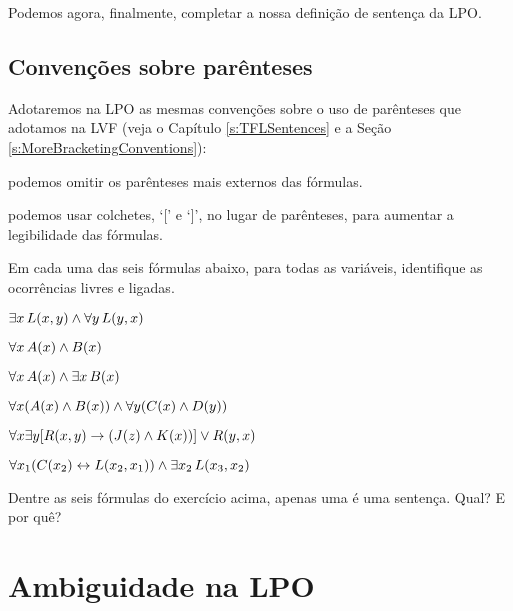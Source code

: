 Podemos agora, finalmente, completar a nossa definição de sentença da LPO.


\section{Convenções sobre parênteses}

Adotaremos na LPO as mesmas convenções sobre o uso de parênteses que adotamos na LVF (veja o Capítulo \ref{s:TFLSentences} e a Seção \ref{s:MoreBracketingConventions}):
\begin{ebullet}
	\item podemos omitir os parênteses mais externos das fórmulas.
	\item podemos usar colchetes, `[' e `]', no lugar de parênteses, para aumentar a legibilidade das fórmulas.
\end{ebullet}



\practiceproblems
\problempart
\label{pr.freeFOL}
Em cada uma das seis fórmulas abaixo, para todas as variáveis, identifique as ocorrências livres e ligadas.
\begin{earg}
\item $\exists x\, \mathord{L}(x,y) \wedge \forall y\, \mathord{L}(y,x)$
\item $\forall x\, \mathord{A}(x) \wedge \mathord{B}(x)$
\item $\forall x\, \mathord{A}(x) \wedge \exists x\, \mathord{B}(x)$
\item $\forall x (\mathord{A}(x) \wedge \mathord{B}(x)) \wedge \forall y(\mathord{C}(x) \wedge \mathord{D}(y))$
\item $\forall x\exists y[\mathord{R}(x,y) \rightarrow (\mathord{J}(z) \wedge \mathord{K}(x))] \vee \mathord{R}(y,x)$
\item $\forall x_1(\mathord{C}(x_2) \leftrightarrow \mathord{L}(x_2,x_1)) \wedge \exists x_2\,\mathord{L}(x_3,x_2)$
\end{earg}

\problempart
Dentre as seis fórmulas do exercício acima, apenas uma é uma sentença.
Qual? E por quê?

\chapter{Ambiguidade na LPO}\label{s:ambiguityFOL}

